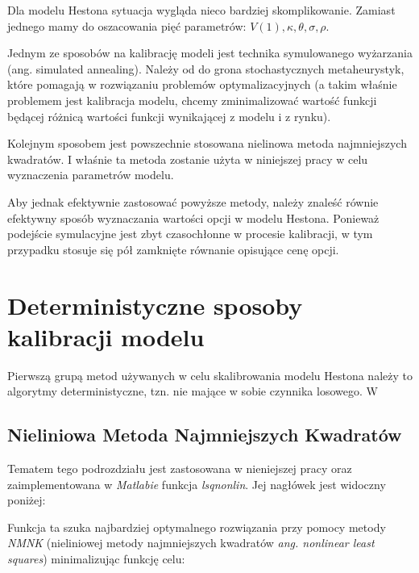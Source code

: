 \documentclass{pracamgr}
\begin{document}
Dla modelu Hestona sytuacja wygląda nieco bardziej skomplikowanie. Zamiast jednego mamy do oszacowania pięć parametrów:
$V(1),\kappa, \theta, \sigma, \rho$.  



Jednym ze sposobów na kalibrację modeli jest technika symulowanego wyżarzania (ang. simulated annealing). Należy od do 
grona stochastycznych metaheurystyk, które pomagają w rozwiązaniu problemów optymalizacyjnych (a takim właśnie problemem 
jest kalibracja modelu, chcemy zminimalizować wartość funkcji będącej różnicą wartości funkcji wynikającej z 
modelu i z rynku).

Kolejnym sposobem jest powszechnie stosowana nielinowa metoda najmniejszych kwadratów. I właśnie ta metoda zostanie 
użyta w niniejszej pracy w celu wyznaczenia parametrów modelu.

Aby jednak efektywnie zastosować powyższe metody, należy znaleść równie efektywny sposób wyznaczania wartości opcji w 
modelu Hestona. Ponieważ podejście symulacyjne jest zbyt czasochłonne w procesie kalibracji, w tym przypadku stosuje 
się pół zamknięte równanie opisujące cenę opcji.


\section{Deterministyczne sposoby kalibracji modelu} 
Pierwszą grupą metod używanych w celu skalibrowania modelu Hestona należy to algorytmy deterministyczne, tzn. nie mające w sobie czynnika losowego. W


\subsection{Nieliniowa Metoda Najmniejszych Kwadratów}

Tematem tego podrozdziału jest zastosowana w nieniejszej pracy oraz zaimplementowana w \textit{Matlabie} 
funkcja \textit{lsqnonlin}. Jej nagłówek jest widoczny poniżej:


Funkcja ta szuka najbardziej optymalnego rozwiązania przy pomocy metody \textit{NMNK} (nieliniowej metody najmniejszych 
kwadratów \textit{ang. nonlinear least squares}) minimalizując funkcję celu:
\end{document}

